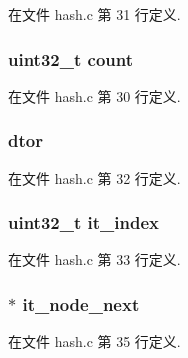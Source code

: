 在文件 hash.\+c 第 31 行定义.

\hypertarget{struct__hash__t_a86988a65e0d3ece7990c032c159786d6}{}
\subsubsection[{count}]{\setlength{\rightskip}{0pt plus 5cm}uint32\+\_\+t count}\label{struct__hash__t_a86988a65e0d3ece7990c032c159786d6}


在文件 hash.\+c 第 30 行定义.

\hypertarget{struct__hash__t_a1d83dcf7c1891a605ea334819ac644fb}{}
\subsubsection[{dtor}]{ dtor}\label{struct__hash__t_a1d83dcf7c1891a605ea334819ac644fb}


在文件 hash.\+c 第 32 行定义.

\hypertarget{struct__hash__t_a028bed28cdb43f02ee8bb330d2cc5653}{}
\subsubsection[{it\+\_\+index}]{\setlength{\rightskip}{0pt plus 5cm}uint32\+\_\+t it\+\_\+index}\label{struct__hash__t_a028bed28cdb43f02ee8bb330d2cc5653}


在文件 hash.\+c 第 33 行定义.

\hypertarget{struct__hash__t_a177625c1a4b1b746c710f82bf485fdb9}{}
\subsubsection[{it\+\_\+node\+\_\+next}]{$\ast$ it\+\_\+node\+\_\+next}\label{struct__hash__t_a177625c1a4b1b746c710f82bf485fdb9}


在文件 hash.\+c 第 35 行定义.


